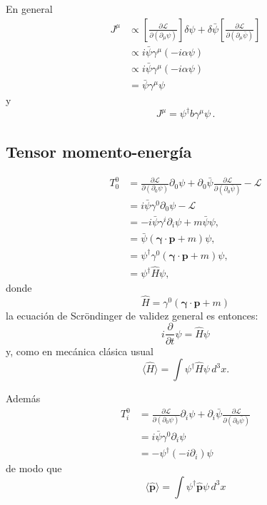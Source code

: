 En general
\begin{align}
   J^\mu&\propto\left[\frac{\partial\mathcal{L}}{\partial\left(\partial_\mu\psi\right)}\right]\delta\psi+\delta\bar{\psi}\left[\frac{\partial\mathcal{L}}{\partial\left(\partial_\mu\bar{\psi}\right)}\right]\nonumber\\
   &\propto i\bar{\psi}\gamma^\mu(-i\alpha\psi)\nonumber\\
   &\propto i\bar{\psi}\gamma^\mu(-i\alpha\psi)\nonumber\\
   &=\bar{\psi}\gamma^\mu\psi
\end{align}
y
\begin{equation}
     J^\mu=\psi^\dagger b \gamma^\mu\psi\,.
\end{equation}

\subsection{Tensor momento-energía}
\label{sec:tens-momento-energi}
\begin{align}
  T^0_0&=\frac{\partial\mathcal{L}}{\partial\left(\partial_0\psi\right)}\partial_0\psi+\partial_0\bar{\psi}\frac{\partial\mathcal{L}}{\partial\left(\partial_0\bar{\psi}\right)}-\mathcal{L}\nonumber\\
  &=i\bar{\psi}\gamma^0\partial_0\psi-\mathcal{L}\nonumber\\
  &=-i\bar{\psi}\gamma^i\partial_i\psi+m\bar{\psi} \psi,\nonumber\\
  &=\bar{\psi}(\boldsymbol{\gamma}\cdot\mathbf{p}+m)\psi,\nonumber\\
  &=\psi^\dagger \gamma^0(\boldsymbol{\gamma}\cdot\mathbf{p}+m)\psi,\nonumber\\
  \label{eq:118qft}
  &=\psi^\dagger\hat{H} \psi,
\end{align}
donde
\begin{equation}
  \label{eq:denshal}
  \hat{H}= \gamma^0(\boldsymbol{\gamma}\cdot\mathbf{p}+m)
\end{equation}
la ecuación de Scröndinger de validez general es entonces:
\begin{equation}
  i\frac{\partial}{\partial t}\psi=\hat{H} \psi
\end{equation}
y, como en mecánica clásica usual
\begin{equation}
  \label{eq:99qft}
  \langle\hat{H}\rangle=\int \psi^\dagger\hat{H} \psi\,d^3x.
\end{equation}


Además
\begin{align}
    T^0_i&=\frac{\partial\mathcal{L}}{\partial\left(\partial_0\psi\right)}\partial_i\psi+\partial_i\bar{\psi}\frac{\partial\mathcal{L}}{\partial\left(\partial_0\bar{\psi}\right)}\nonumber\\
    &=i\bar{\psi}\gamma^0 \partial_i\psi\nonumber\\
    &=-\psi^\dagger(-i\partial_i)\psi
\end{align}
de modo que
\begin{equation}
  \langle\hat{\mathbf{p}}\rangle=\int\psi^\dagger\hat{\mathbf{p}}\psi\,d^3 x
\end{equation}
